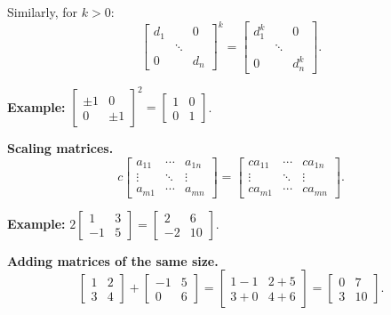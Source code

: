 \documentclass{article}
\begin{document}
\bigskip

Similarly, for $k > 0$:
\[
\begin{bmatrix} d_1 & & 0 \\ & \ddots & \\ 0 & & d_n \end{bmatrix}^k = \begin{bmatrix} d_1^k & & 0 \\ & \ddots & \\ 0 & & d_n^k \end{bmatrix}.
\]

\bigskip

\textbf{Example:} $\begin{bmatrix} \pm 1 & 0 \\ 0 & \pm 1 \end{bmatrix}^2 = \begin{bmatrix} 1 & 0 \\ 0 & 1 \end{bmatrix}$.

\newpage

\textbf{Scaling matrices.}
\[
c \begin{bmatrix} a_{11} & \cdots & a_{1n} \\ \vdots & \ddots & \vdots \\ a_{m1} & \cdots & a_{mn} \end{bmatrix}
= \begin{bmatrix} ca_{11} & \cdots & ca_{1n} \\ \vdots & \ddots & \vdots \\ ca_{m1} & \cdots & ca_{mn} \end{bmatrix}.
\]

\medskip

\textbf{Example:} $2 \begin{bmatrix} 1 & 3 \\ -1 & 5 \end{bmatrix} = \begin{bmatrix} 2 & 6 \\ -2 & 10 \end{bmatrix}$.

\bigskip

\textbf{Adding matrices of the same size.}
\[
\begin{bmatrix} 1 & 2 \\ 3 & 4 \end{bmatrix} + \begin{bmatrix} -1 & 5 \\ 0 & 6 \end{bmatrix} = \begin{bmatrix} 1-1 & 2+5 \\ 3+0 & 4+6 \end{bmatrix} = \begin{bmatrix} 0 & 7 \\ 3 & 10 \end{bmatrix}.
\]
\end{document}
